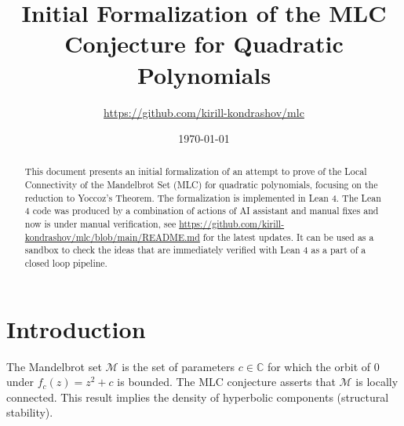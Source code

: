 \documentclass[reqno]{amsart}
\title{Initial Formalization of the MLC Conjecture for Quadratic Polynomials}
\author{\url{https://github.com/kirill-kondrashov/mlc}}
\date{\today}
\begin{document}
\begin{abstract}
  This document presents an initial formalization of an attempt to prove of the Local Connectivity of the Mandelbrot Set (MLC) for quadratic polynomials, focusing on the reduction to Yoccoz's Theorem. The formalization is implemented in Lean 4. The Lean 4 code was produced by a combination of actions of AI assistant and manual fixes and now is under manual verification, see \url{https://github.com/kirill-kondrashov/mlc/blob/main/README.md} for the latest updates. It can be used as a sandbox to check the ideas that are immediately verified with Lean 4 as a part of a closed loop pipeline.
\end{abstract}

\maketitle

\vspace{1em}
\noindent
{}
\vspace{1em}

\section{Introduction}

The Mandelbrot set $\mathcal{M}$ is the set of parameters $c \in \mathbb{C}$ for which the orbit of 0 under $f_c(z) = z^2 + c$ is bounded. The MLC conjecture asserts that $\mathcal{M}$ is locally connected. This result implies the density of hyperbolic components (structural stability).
\end{document}
